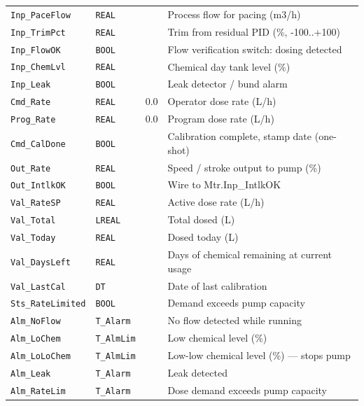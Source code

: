 \begin{small}
\begin{longtable}{@{}P{3.70cm}P{2.20cm}P{1.70cm}P{8.91cm}@{}}
\texttt{Inp\_PaceFlow} & \texttt{REAL} &  & Process flow for pacing (m3/\allowbreak{}h) \\
\texttt{Inp\_TrimPct} & \texttt{REAL} &  & Trim from residual PID (\%, -100..+100) \\
\texttt{Inp\_FlowOK} & \texttt{BOOL} &  & Flow verification switch: dosing detected \\
\texttt{Inp\_ChemLvl} & \texttt{REAL} &  & Chemical day tank level (\%) \\
\texttt{Inp\_Leak} & \texttt{BOOL} &  & Leak detector /\allowbreak{} bund alarm \\
\texttt{Cmd\_Rate} & \texttt{REAL} & 0.0 & Operator dose rate (L/\allowbreak{}h) \\
\texttt{Prog\_Rate} & \texttt{REAL} & 0.0 & Program dose rate (L/\allowbreak{}h) \\
\texttt{Cmd\_CalDone} & \texttt{BOOL} &  & Calibration complete, stamp date (one-shot) \\
\texttt{Out\_Rate} & \texttt{REAL} &  & Speed /\allowbreak{} stroke output to pump (\%) \\
\texttt{Out\_IntlkOK} & \texttt{BOOL} &  & Wire to Mtr.Inp\_IntlkOK \\
\texttt{Val\_RateSP} & \texttt{REAL} &  & Active dose rate (L/\allowbreak{}h) \\
\texttt{Val\_Total} & \texttt{LREAL} &  & Total dosed (L) \\
\texttt{Val\_Today} & \texttt{REAL} &  & Dosed today (L) \\
\texttt{Val\_DaysLeft} & \texttt{REAL} &  & Days of chemical remaining at current usage \\
\texttt{Val\_LastCal} & \texttt{DT} &  & Date of last calibration \\
\texttt{Sts\_RateLimited} & \texttt{BOOL} &  & Demand exceeds pump capacity \\
\texttt{Alm\_NoFlow} & \texttt{T\_Alarm} &  & No flow detected while running \\
\texttt{Alm\_LoChem} & \texttt{T\_AlmLim} &  & Low chemical level (\%) \\
\texttt{Alm\_LoLoChem} & \texttt{T\_AlmLim} &  & Low-low chemical level (\%) --- stops pump \\
\texttt{Alm\_Leak} & \texttt{T\_Alarm} &  & Leak detected \\
\texttt{Alm\_RateLim} & \texttt{T\_Alarm} &  & Dose demand exceeds pump capacity \\
\bottomrule
\end{longtable}
\end{small}

